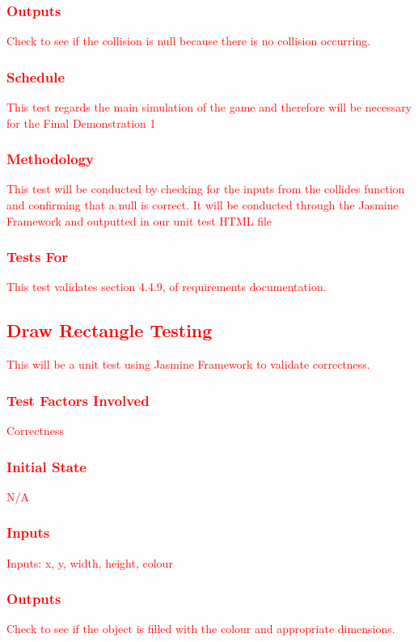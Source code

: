 \documentclass[11pt, oneside]{article}   	%
\begin{document}
\subsubsection{\textcolor{red}{Outputs}}
\textcolor{red}{Check to see if the collision is null because there is no collision occurring.}
\subsubsection{\textcolor{red}{Schedule}}
\textcolor{red}{This test regards the main simulation of the game and therefore will be necessary for the Final Demonstration 1}
\subsubsection{\textcolor{red}{Methodology}}
\textcolor{red}{This test will be conducted by checking for the inputs from the collides function and confirming that a null is correct. It will be conducted through the Jasmine Framework and outputted in our unit test HTML file}
\subsubsection{\textcolor{red}{Tests For}}
\textcolor{red}{This test validates section 4.4.9, of requirements documentation.}


\subsection{\textcolor{red}{Draw Rectangle Testing}}
\textcolor{red}{This will be a unit test using Jasmine Framework to validate correctness.}
\subsubsection{\textcolor{red}{Test Factors Involved}}
\textcolor{red}{Correctness}
\subsubsection{\textcolor{red}{Initial State}}
\textcolor{red}{N/A}
\subsubsection{\textcolor{red}{Inputs}}
\textcolor{red}{Inputs: x, y, width, height, colour}
\subsubsection{\textcolor{red}{Outputs}}
\textcolor{red}{Check to see if the object is filled with the colour and appropriate dimensions.}
\end{document}
